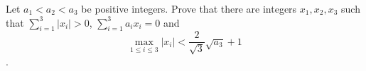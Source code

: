 Let $a_1<a_2<a_3$ be positive integers. Prove that there are integers $x_1,x_2,x_3$ such that $\sum_{i=1}^3 |x_i | >0$, $\sum_{i=1}^3 a_ix_i= 0$ and
$$\max_{1\le i\le 3} | x_i|<\frac{2}{\sqrt{3}}\sqrt{a_3}+1$$.